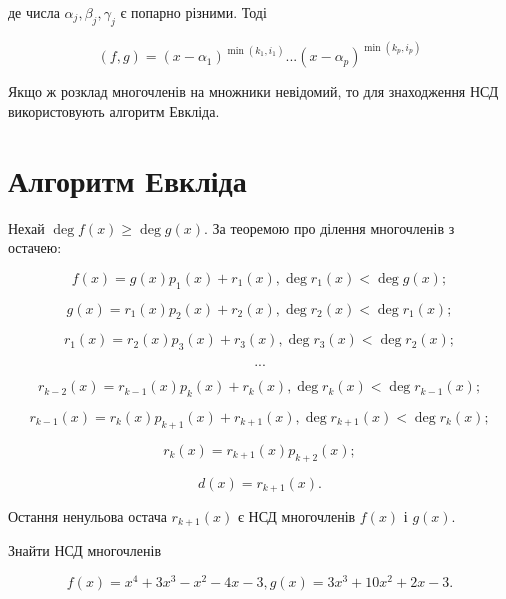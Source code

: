 де числа $\alpha_j, \beta_j, \gamma_j$ є попарно різними. Тоді

$$(f,g) = (x-\alpha_1)^{\min(k_1,i_1)}...(x-\alpha_p)^{\min(k_p,i_p)}$$

Якщо ж розклад многочленів на множники невідомий, то для знаходження
НСД використовують алгоритм Евкліда. 

\section{Алгоритм Евкліда}

Нехай $\deg f(x) \geqslant \deg g(x)$. За теоремою про ділення многочленів з остачею:

$$f(x) = g(x)p_1(x) + r_1(x), \deg r_1(x) < \deg g(x);$$

$$g(x) = r_1(x)p_2(x) + r_2(x), \deg r_2(x) < \deg r_1(x);$$

$$r_1(x) = r_2(x)p_3(x) + r_3(x), \deg r_3(x) < \deg r_2(x);$$

$$...$$

$$r_{k-2}(x) = r_{k-1}(x)p_k(x) + r_k(x), \deg r_k(x) < \deg r_{k-1}(x);$$

$$r_{k-1}(x) = r_{k}(x)p_{k+1}(x) + r_{k+1}(x), \deg r_{k+1}(x) < \deg r_{k}(x);$$

$$r_{k}(x) = r_{k+1}(x)p_{k+2}(x);$$

$$d(x) = r_{k+1}(x).$$

Остання ненульова остача $r_{k+1}(x)$ є НСД многочленів $f(x)$ і $g(x)$.

\begin{problem}
	Знайти НСД многочленів

	$$f(x) = x^4 + 3x^3 - x^2 - 4x - 3, g(x) = 3x^3 + 10x^2 + 2x -3.$$
\end{problem}

